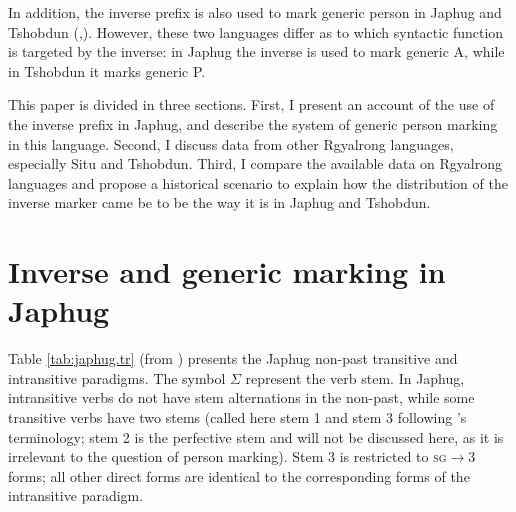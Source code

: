 \documentclass[oldfontcommands,oneside,a4paper,11pt]{article}
\newcommand{\ro}{$\Sigma$}
\begin{document}
In addition, the inverse prefix is also used to mark generic person in Japhug and Tshobdun  (\citealt{jacques12demotion},\citealt{sun14generic}). However, these two languages differ as to which syntactic function is targeted by the inverse: in Japhug the inverse is used to mark generic A, while in Tshobdun it marks generic P. 

  This paper is divided in three sections. First, I present an account of the use of the inverse prefix in Japhug, and describe the system of generic person marking in this language. Second, I  discuss data from other Rgyalrong languages, especially Situ and Tshobdun. Third, I compare the available data on Rgyalrong languages and propose   a historical scenario to explain how the distribution of the inverse marker came be to be the way it is in Japhug and Tshobdun.
 
 
\section{Inverse and generic marking in Japhug} \label{sec:japhug}
Table \ref{tab:japhug.tr} (from  \citealt{jacques10inverse}) presents the Japhug non-past transitive and intransitive paradigms. The symbol \ro{} represent the verb stem. In Japhug, intransitive verbs do not have stem alternations in the non-past, while some transitive verbs have two stems (called here stem 1 and stem 3 following \citealt{jackson00sidaba}'s terminology; stem 2 is the perfective stem and will not be discussed here, as it is irrelevant to the question of person marking). Stem 3 is restricted to \textsc{sg}$\rightarrow$3 forms; all other direct forms are identical to the corresponding forms of the intransitive paradigm.
\end{document}
